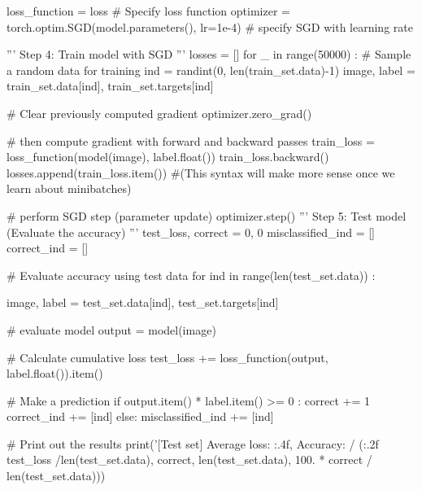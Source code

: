 \documentclass[10pt]{article}
\begin{document}
\begin{python}
loss_function = loss                                          # Specify loss function
optimizer = torch.optim.SGD(model.parameters(), lr=1e-4)   # specify SGD with learning rate

'''
Step 4: Train model with SGD
'''
losses = []
for _ in range(50000) :
    # Sample a random data for training
    ind = randint(0, len(train_set.data)-1)
    image, label = train_set.data[ind], train_set.targets[ind]

    # Clear previously computed gradient
    optimizer.zero_grad()

    # then compute gradient with forward and backward passes
    train_loss = loss_function(model(image), label.float())
    train_loss.backward()
    losses.append(train_loss.item())
    #(This syntax will make more sense once we learn about minibatches)

    # perform SGD step (parameter update)
    optimizer.step()
'''
Step 5: Test model (Evaluate the accuracy)
'''
test_loss, correct = 0, 0
misclassified_ind = []
correct_ind = []

# Evaluate accuracy using test data
for ind in range(len(test_set.data)) :

    image, label = test_set.data[ind], test_set.targets[ind]

    # evaluate model
    output = model(image)

    # Calculate cumulative loss
    test_loss += loss_function(output, label.float()).item()

    # Make a prediction
    if output.item() * label.item() >= 0 :
        correct += 1
        correct_ind += [ind]
    else:
        misclassified_ind += [ind]

# Print out the results
print('[Test set] Average loss: {:.4f}, Accuracy: {}/{} ({:.2f}%
        test_loss /len(test_set.data), correct, len(test_set.data),
        100. * correct / len(test_set.data)))

\end{python}
\end{document}
